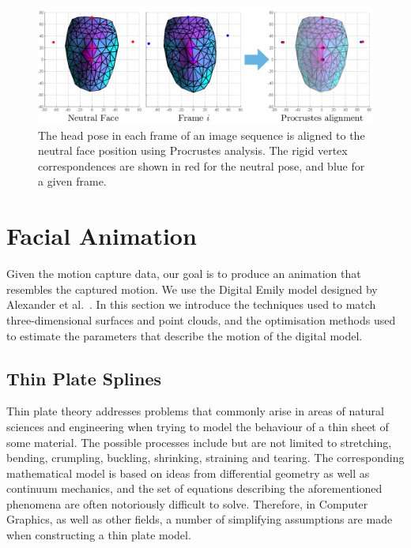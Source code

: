\begin{figure}[htbp!]
\centering
\includegraphics[width=\textwidth]{img/procrustes}
	\caption{The head pose in each frame of an image sequence is aligned to the neutral face position using Procrustes analysis. The rigid vertex correspondences are shown in red for the neutral pose, and blue for a given frame.}
	\label{fig:procrustes}
\end{figure}

\section{Facial Animation}
Given the motion capture data, our goal is to produce an animation that resembles the captured motion. We use the Digital Emily model designed by Alexander et al.~\cite{Alexander:2009}. In this section we introduce the techniques used to match three-dimensional surfaces and point clouds, and the optimisation methods used to estimate the parameters that describe the motion of the digital model.

\subsection{Thin Plate Splines}\label{sec:tps}
Thin plate theory addresses problems that commonly arise in areas of natural sciences and engineering when trying to model the behaviour of a thin sheet of some material. The possible processes include but are not limited to stretching, bending, crumpling, buckling, shrinking, straining and tearing. The corresponding mathematical model is based on ideas from differential geometry as well as continuum mechanics, and the set of equations describing the aforementioned phenomena are often notoriously difficult to solve. Therefore, in Computer Graphics, as well as other fields, a number of simplifying assumptions are made when constructing a thin plate model. 

